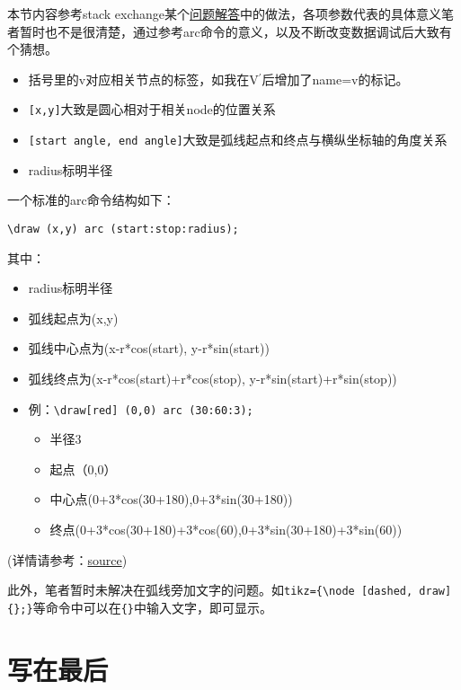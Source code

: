 \documentclass[a4paper,12pt]{article}
\begin{document}
本节内容参考stack exchange某个\href{https://tex.stackexchange.com/questions/164429/in-forest-tikz-for-syntax-trees-how-do-i-create-an-arc-above-one-node-separat}{问题解答}中的做法，各项参数代表的具体意义笔者暂时也不是很清楚，通过参考arc命令的意义，以及不断改变数据调试后大致有个猜想。

\begin{itemize}
	\item 括号里的v对应相关节点的标签，如我在V$^{\prime}$后增加了name=v的标记。
	\item \verb|[x,y]|大致是圆心相对于相关node的位置关系
	\item \verb|[start angle, end angle]|大致是弧线起点和终点与横纵坐标轴的角度关系
	\item radius标明半径
\end{itemize}

\noindent 一个标准的arc命令结构如下：

\verb|\draw (x,y) arc (start:stop:radius);|

\noindent 其中：

\begin{itemize}
	\item radius标明半径
	\item 弧线起点为(x,y)
	\item 弧线中心点为(x-r*cos(start), y-r*sin(start))
	\item 弧线终点为(x-r*cos(start)+r*cos(stop), y-r*sin(start)+r*sin(stop))
	\item 例：\verb|\draw[red] (0,0) arc (30:60:3);|
		\begin{itemize}
			\item 半径3
			\item 起点（0,0）
			\item 中心点(0+3*cos(30+180),0+3*sin(30+180))
			\item 终点(0+3*cos(30+180)+3*cos(60),0+3*sin(30+180)+3*sin(60))
		\end{itemize}
\end{itemize}

\hfill (详情请参考：\href{https://tex.stackexchange.com/questions/175016/how-is-arc-defined-in-tikz}{source})

\vspace{3mm}
此外，笔者暂时未解决在弧线旁加文字的问题。如\verb|tikz={\node [dashed, draw] {};}|等命令中可以在\verb|{}|中输入文字，即可显示。

\section{写在最后}
\end{document}

